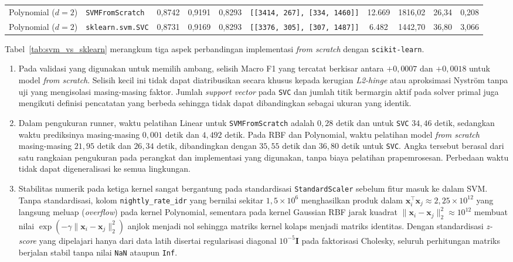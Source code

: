 \begin{table}[H]
{\begin{tabular}{@{}llcccccccc@{}}
            \midrule
            Polynomial ($d=2$) & \texttt{SVMFromScratch}  & 0,8742            & 0,9191          & 0,8293          & \texttt{[[3414, 267], [334, 1460]]}            & 12.669          & 1816,02              & 26,34            & 0,208                \\
            Polynomial ($d=2$) & \texttt{sklearn.svm.SVC} & 0,8731            & 0,9169          & 0,8293          & \texttt{[[3376, 305], [307, 1487]]}            & 6.482           & 1442,70              & 36,80            & 3,066                \\
            \bottomrule
        \end{tabular}%
    }
\end{table}

Tabel~\ref{tab:svm_vs_sklearn} merangkum tiga aspek perbandingan implementasi \textit{from scratch} dengan \texttt{scikit-learn}.
\begin{enumerate}
    \item Pada validasi yang digunakan untuk memilih ambang, selisih Macro F1 yang tercatat berkisar antara $+0{,}0007$ dan $+0{,}0018$ untuk model \textit{from scratch}. Selisih kecil ini tidak dapat diatribusikan secara khusus kepada kerugian \textit{L2-hinge} atau aproksimasi Nystr\"om tanpa uji yang mengisolasi masing-masing faktor. Jumlah \textit{support vector} pada \texttt{SVC} dan jumlah titik bermargin aktif pada solver primal juga mengikuti definisi pencatatan yang berbeda sehingga tidak dapat dibandingkan sebagai ukuran yang identik.
    \item Dalam pengukuran runner, waktu pelatihan Linear untuk \texttt{SVMFromScratch} adalah $0{,}28\text{ detik}$ dan untuk \texttt{SVC} $34{,}46\text{ detik}$, sedangkan waktu prediksinya masing-masing $0{,}001\text{ detik}$ dan $4{,}492\text{ detik}$. Pada RBF dan Polynomial, waktu pelatihan model \textit{from scratch} masing-masing $21{,}95\text{ detik}$ dan $26{,}34\text{ detik}$, dibandingkan dengan $35{,}55\text{ detik}$ dan $36{,}80\text{ detik}$ untuk \texttt{SVC}. Angka tersebut berasal dari satu rangkaian pengukuran pada perangkat dan implementasi yang digunakan, tanpa biaya pelatihan prapemrosesan. Perbedaan waktu tidak dapat digeneralisasi ke semua lingkungan.
    \item Stabilitas numerik pada ketiga kernel sangat bergantung pada standardisasi \texttt{StandardScaler} sebelum fitur masuk ke dalam SVM. Tanpa standardisasi, kolom \texttt{nightly\_rate\_idr} yang bernilai sekitar $1{,}5 \times 10^6$ menghasilkan produk dalam $\mathbf{x}_i^\top \mathbf{x}_j \approx 2{,}25 \times 10^{12}$ yang langsung meluap (\textit{overflow}) pada kernel Polynomial, sementara pada kernel Gaussian RBF jarak kuadrat $\|\mathbf{x}_i - \mathbf{x}_j\|_2^2 \approx 10^{12}$ membuat nilai $\exp(-\gamma \|\mathbf{x}_i - \mathbf{x}_j\|_2^2)$ anjlok menjadi nol sehingga matriks kernel kolaps menjadi matriks identitas. Dengan standardisasi \textit{z-score} yang dipelajari hanya dari data latih disertai regularisasi diagonal $10^{-5}\mathbf{I}$ pada faktorisasi Cholesky, seluruh perhitungan matriks berjalan stabil tanpa nilai \texttt{NaN} ataupun \texttt{Inf}.
\end{enumerate}

